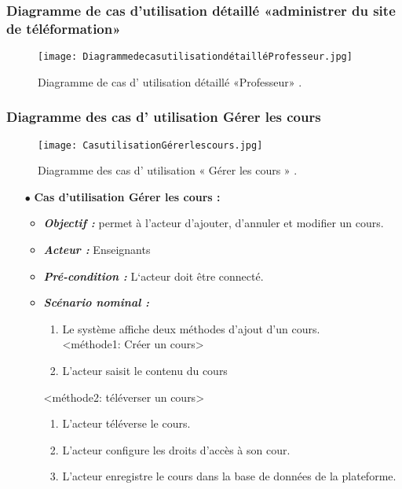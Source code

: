 \subsubsection{Diagramme de cas d’utilisation  détaillé «administrer du site de téléformation» }

\begin{figure}[ht]
	\centering
	\texttt{[image: DiagrammedecasutilisationdétailléProfesseur.jpg]}
	\caption{Diagramme de cas d' utilisation  détaillé «Professeur» .}
	\label{fig:Diagramme de cas d' utilisation  détaillé Professeur  }
\end{figure}
\FloatBarrier

\subsubsection{Diagramme des cas d' utilisation  Gérer les cours }
\begin{figure}[ht]
	\centering
	\texttt{[image: CasutilisationGérerlescours.jpg]}
	\caption{Diagramme des cas d' utilisation « Gérer les cours » .}
	\label{fig:Diagramme des cas d' utilisation  Gérer les cours  }
\end{figure}
\FloatBarrier


\begin{itemize}
	\item[$\bullet$] \textbf{Cas d’utilisation Gérer les cours :}
	\medskip
	\begin{itemize}
		\item \textit{\textbf{Objectif :}}  permet à l’acteur d’ajouter, d’annuler et modifier un cours.
		
		\item \textit{\textbf{Acteur :}} Enseignants
		
		\item \textit{\textbf{Pré-condition :}} L‘acteur doit être connecté.
		\item \textit{\textbf{Scénario nominal   :}}
		\begin{enumerate}
			\item  Le système affiche deux méthodes d’ajout d’un cours.\\
			<méthode1: Créer un cours> 
			\item L’acteur saisit le contenu du cours 
		\end{enumerate}
	<méthode2: téléverser un cours>
		\begin{enumerate}
			\item   L’acteur téléverse le cours.  
			\item  L’acteur configure les droits d’accès à son cour.
			\item  L’acteur enregistre le cours dans la base de données de la plateforme.
		\end{enumerate}
	\end{itemize}
\end{itemize}	
\bigskip



